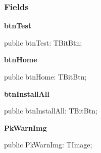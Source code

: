 \documentclass{report}
\newif\ifpdf
\begin{document}
\subsubsection*{\large{\textbf{Fields}}\normalsize\hspace{1ex}\hfill}
\begin{list}{}{
\setlength{\itemindent}{0cm}
\setlength{\listparindent}{0cm}
\setlength{\leftmargin}{\evensidemargin}
\addtolength{\leftmargin}{\tmplength}
\settowidth{\labelsep}{X}
\addtolength{\leftmargin}{\labelsep}
\setlength{\labelwidth}{\tmplength}
}
\label{xtypefm.TimdFrm-btnTest}
\item[\textbf{btnTest}\hfill]
\ifpdf
\begin{flushleft}
\fi
\begin{ttfamily}
public btnTest: TBitBtn;\end{ttfamily}

\ifpdf
\end{flushleft}
\fi


\par  \label{xtypefm.TimdFrm-btnHome}
\item[\textbf{btnHome}\hfill]
\ifpdf
\begin{flushleft}
\fi
\begin{ttfamily}
public btnHome: TBitBtn;\end{ttfamily}

\ifpdf
\end{flushleft}
\fi


\par  \label{xtypefm.TimdFrm-btnInstallAll}
\item[\textbf{btnInstallAll}\hfill]
\ifpdf
\begin{flushleft}
\fi
\begin{ttfamily}
public btnInstallAll: TBitBtn;\end{ttfamily}

\ifpdf
\end{flushleft}
\fi


\par  \label{xtypefm.TimdFrm-PkWarnImg}
\item[\textbf{PkWarnImg}\hfill]
\ifpdf
\begin{flushleft}
\fi
\begin{ttfamily}
public PkWarnImg: TImage;\end{ttfamily}

\ifpdf
\end{flushleft}
\fi



\end{list}
\end{document}
